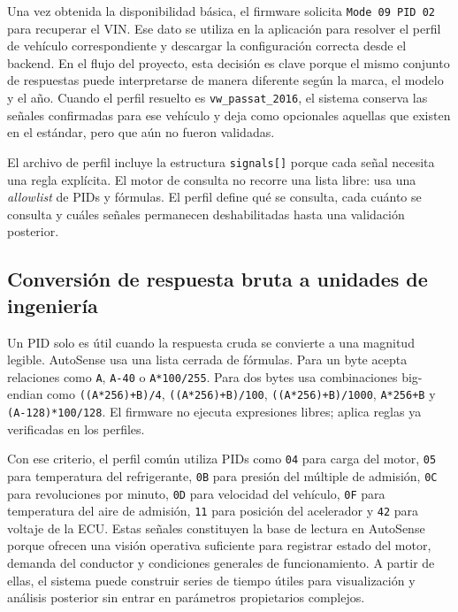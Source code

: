 \documentclass[12pt,letterpaper]{report}
\begin{document}
Una vez obtenida la disponibilidad básica, el firmware solicita \texttt{Mode 09 PID 02} para recuperar el VIN. Ese dato se utiliza en la aplicación para resolver el perfil de vehículo correspondiente y descargar la configuración correcta desde el backend. En el flujo del proyecto, esta decisión es clave porque el mismo conjunto de respuestas puede interpretarse de manera diferente según la marca, el modelo y el año. Cuando el perfil resuelto es \texttt{vw\_passat\_2016}, el sistema conserva las señales confirmadas para ese vehículo y deja como opcionales aquellas que existen en el estándar, pero que aún no fueron validadas.

El archivo de perfil incluye la estructura \texttt{signals[]} porque cada señal necesita una regla explícita. El motor de consulta no recorre una lista libre: usa una \textit{allowlist} de PIDs y fórmulas. El perfil define qué se consulta, cada cuánto se consulta y cuáles señales permanecen deshabilitadas hasta una validación posterior.

\subsection{Conversión de respuesta bruta a unidades de ingeniería}

Un PID solo es útil cuando la respuesta cruda se convierte a una magnitud legible. AutoSense usa una lista cerrada de fórmulas. Para un byte acepta relaciones como \texttt{A}, \texttt{A-40} o \texttt{A*100/255}. Para dos bytes usa combinaciones big-endian como \texttt{((A*256)+B)/4}, \texttt{((A*256)+B)/100}, \texttt{((A*256)+B)/1000}, \texttt{A*256+B} y \texttt{(A-128)*100/128}. El firmware no ejecuta expresiones libres; aplica reglas ya verificadas en los perfiles.

Con ese criterio, el perfil común utiliza PIDs como \texttt{04} para carga del motor, \texttt{05} para temperatura del refrigerante, \texttt{0B} para presión del múltiple de admisión, \texttt{0C} para revoluciones por minuto, \texttt{0D} para velocidad del vehículo, \texttt{0F} para temperatura del aire de admisión, \texttt{11} para posición del acelerador y \texttt{42} para voltaje de la ECU. Estas señales constituyen la base de lectura en AutoSense porque ofrecen una visión operativa suficiente para registrar estado del motor, demanda del conductor y condiciones generales de funcionamiento. A partir de ellas, el sistema puede construir series de tiempo útiles para visualización y análisis posterior sin entrar en parámetros propietarios complejos.
\end{document}
